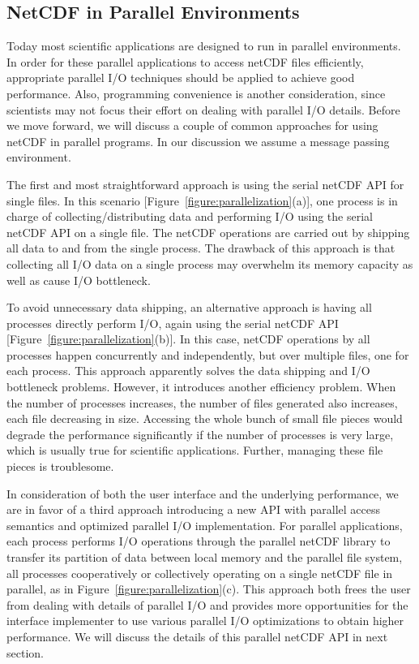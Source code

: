 \documentclass[10pt,twocolumn]{article}          %
\begin{document}
\subsection{NetCDF in Parallel Environments}

Today most scientific applications are designed to run in parallel environments. In order for these
parallel applications to access netCDF files efficiently, appropriate parallel I/O techniques
should be applied to achieve good performance. Also, programming convenience is another
consideration, since scientists may not focus their effort on dealing with parallel I/O details.
Before we move forward, we will discuss a couple of common approaches for using netCDF in parallel
programs. In our discussion we assume a message passing environment.

The first and most straightforward approach is using the serial netCDF API for single files. In
this scenario [Figure~\ref{figure:parallelization}(a)], one process is in charge of
collecting/distributing data and performing I/O using the serial netCDF API on a single file. The
netCDF operations are carried out by shipping all data to and from the single process. The drawback
of this approach is that collecting all I/O data on a single process may overwhelm its memory
capacity as well as cause I/O bottleneck.

To avoid unnecessary data shipping, an alternative approach is
having all processes directly perform I/O, again using the serial
netCDF API [Figure~\ref{figure:parallelization}(b)]. In this case,
netCDF operations by all processes happen concurrently and
independently, but over multiple files, one for each process. This
approach apparently solves the data shipping and I/O bottleneck
problems. However, it introduces another efficiency problem. When
the number of processes increases, the number of files generated
also increases, each file decreasing in size. Accessing the whole
bunch of small file pieces would degrade the performance
significantly if the number of processes is very large, which is
usually true for scientific applications. Further, managing these
file pieces is troublesome.

In consideration of both the user interface and the underlying performance, we are in favor of a
third approach introducing a new API with parallel access semantics and optimized parallel I/O
implementation. For parallel applications, each process performs I/O operations through the
parallel netCDF library to transfer its partition of data between local memory and the parallel
file system, all processes cooperatively or collectively operating on a single netCDF file in
parallel, as in Figure~\ref{figure:parallelization}(c). This approach both frees the user from
dealing with details of parallel I/O and provides more opportunities for the interface implementer
to use various parallel I/O optimizations to obtain higher performance. We will discuss the details
of this parallel netCDF API in next section.
\end{document}
